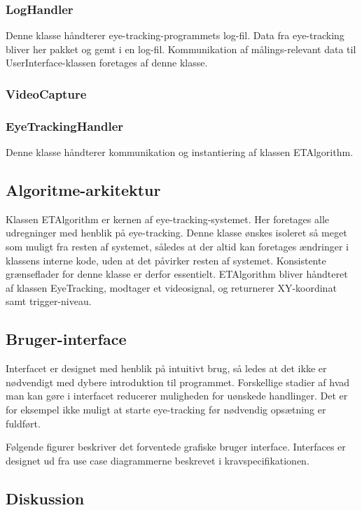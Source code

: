 \documentclass[rapport.tex]{subfiles}
\begin{document}
		\subsubsection{LogHandler}
		Denne klasse håndterer eye-tracking-programmets log-fil. Data fra eye-tracking bliver her pakket og gemt i en log-fil. Kommunikation af målings-relevant data til UserInterface-klassen foretages af denne klasse.
		\subsubsection{VideoCapture}
		\subsubsection{EyeTrackingHandler}
		Denne klasse håndterer kommunikation og instantiering af klassen ETAlgorithm. 
		
	\subsection{Algoritme-arkitektur}
	Klassen ETAlgorithm er kernen af eye-tracking-systemet. Her foretages alle udregninger med henblik på eye-tracking. Denne klasse ønskes isoleret så meget som muligt fra resten af systemet, således at der altid kan foretages ændringer i klassens interne kode, uden at det påvirker resten af systemet. Konsistente grænseflader for denne klasse er derfor essentielt. 
	ETAlgorithm bliver håndteret af klassen EyeTracking, modtager et videosignal, og returnerer XY-koordinat samt trigger-niveau. 
	
	\subsection{Bruger-interface}
	Interfacet er designet med henblik på intuitivt brug, så ledes at det ikke er nødvendigt med dybere introduktion til programmet. Forskellige stadier af hvad man kan gøre i interfacet reducerer muligheden for uønskede handlinger. Det er for eksempel ikke muligt at starte eye-tracking før nødvendig opsætning er fuldført. 
	
	Følgende figurer beskriver det forventede grafiske bruger interface. Interfaces er designet ud fra use case diagrammerne beskrevet i kravspecifikationen.
	\subsection{Diskussion}
\end{document}
